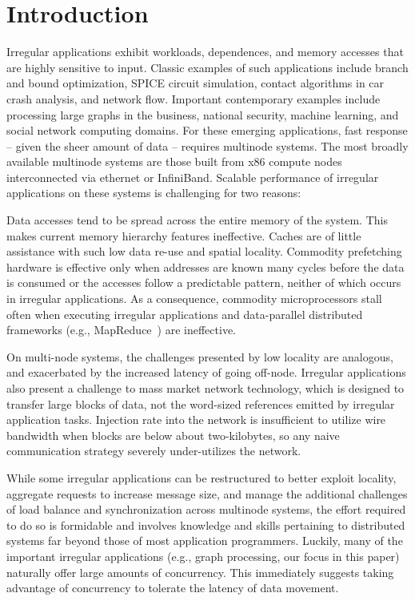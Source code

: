 \section{Introduction} \label{sec:intro}

Irregular applications exhibit workloads, dependences, and memory accesses
that are highly sensitive to input. Classic examples of such applications
include branch and bound optimization, SPICE circuit simulation, contact
algorithms in car crash analysis, and network flow. Important contemporary
examples include processing large graphs in the business, national security,
machine learning, and social network computing domains. For these emerging
applications, fast response -- given the sheer amount of data -- requires
multinode systems. The most broadly available multinode systems are those
built from x86 compute nodes interconnected via ethernet or InfiniBand.
Scalable performance of irregular applications on these systems is challenging
for two reasons:

 Data
accesses tend to be spread across the entire memory of the system. This makes
current memory hierarchy features ineffective. Caches are of little assistance
with such low data re-use and spatial locality. Commodity prefetching hardware
is effective only when addresses are known many cycles before the data is
consumed or the accesses follow a predictable pattern, neither of which occurs
in irregular applications. As a consequence, commodity microprocessors stall
often when executing irregular applications and data-parallel distributed
frameworks (e.g., MapReduce~\cite{mapreduce:osdi04}) are ineffective.

 On multi-node systems, the challenges presented by low
locality are analogous, and exacerbated by the increased latency of going
off-node. Irregular applications also present a challenge to mass market
network technology, which is designed to transfer large blocks of data, not
the word-sized references emitted by irregular application tasks. Injection
rate into the network is insufficient to utilize wire bandwidth when blocks
are below about two-kilobytes, so any naive communication strategy severely
under-utilizes the network.

While some irregular applications can be restructured to better exploit
locality, aggregate requests to increase message size, and manage the
additional challenges of load balance and synchronization across multinode
systems, the effort required to do so is formidable and involves knowledge and
skills pertaining to distributed systems far beyond those of most application
programmers. Luckily, many of the important irregular applications (e.g.,
graph processing, our focus in this paper) naturally offer large amounts of
concurrency. This immediately suggests taking advantage of concurrency to
tolerate the latency of data movement.

